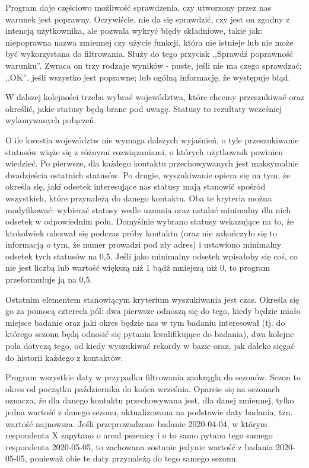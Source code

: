 \documentclass[12pt, twoside, hidelinks]{report}
\begin{document}
Program daje częściowo możliwość sprawdzenia, czy utworzony przez nas warunek jest poprawny. Oczywiście, nie da się sprawdzić, czy jest on zgodny z intencją użytkownika, ale pozwala wykryć błędy składniowe, takie jak: niepoprawna nazwa zmiennej czy użycie funkcji, która nie istnieje lub nie może być wykorzystana do filtrowania. Służy do tego przycisk ,,Sprawdź poprawność warunku''. Zwraca on trzy rodzaje wyników - puste, jeśli nie ma czego sprawdzać; ,,OK'', jeśli wszystko jest poprawne; lub ogólną informację, że występuje błąd. \par
W dalszej kolejności trzeba wybrać województwa, które chcemy przeszukiwać oraz określić, jakie statusy będą brane pod uwagę. Statusy to rezultaty wcześniej wykonywanych połączeń. \par
O ile kwestia województw nie wymaga dalszych wyjaśnień, o tyle przeszukiwanie statusów wiąże się z różnymi rozwiązaniami, o których użytkownik powinien wiedzieć. Po pierwsze, dla każdego kontaktu przechowywanych jest maksymalnie dwadzieścia ostatnich statusów. Po drugie, wyszukiwanie opiera się na tym, że określa się, jaki odsetek interesujące nas statusy mają stanowić spośród wszystkich, które przynależą do danego kontaktu. Oba te kryteria można modyfikować: wybierać statusy wedle uznania oraz ustalać minimalny dla nich odsetek w odpowiednim polu. Domyślnie wybrano statusy wskazujące na to, że ktokolwiek odezwał się podczas próby kontaktu (oraz nie zakończyło się to informacją o tym, że numer prowadzi pod zły adres) i ustawiono minimalny odsetek tych statusów na 0,5. Jeśli jako minimalny odsetek wpisałoby się coś, co nie jest liczbą lub wartość większą niż 1 bądź mniejszą niż 0, to program przeformułuje ją na 0,5.\par
Ostatnim elementem stanowiącym kryterium wyszukiwania jest czas. Określa się go za pomocą czterech pól: dwa pierwsze odnoszą się do tego, kiedy będzie miało miejsce badanie oraz jaki okres będzie nas w tym badaniu interesował (tj. do którego sezonu będą odnosić się pytania kwalifikujące do badania), dwa kolejne pola dotyczą tego, od kiedy wyszukiwać rekordy w bazie oraz, jak daleko sięgać do historii każdego z kontaktów. \par
Program wszystkie daty w przypadku filtrowania zaokrągla do sezonów. Sezon to okres od początku października do końca września. Oparcie się na sezonach oznacza, że dla danego kontaktu przechowywana jest, dla danej zmiennej, tylko jedna wartość z danego sezonu, aktualizowana na podstawie daty badania, tzn. wartość najnowsza. Jeśli przeprowadzono badanie 2020-04-04, w którym respondenta X zapytano o areał pszenicy i o to samo pytano tego samego respondenta 2020-05-05, to zachowana zostanie jedynie wartość z badania 2020-05-05, ponieważ obie te daty przynależą do tego samego sezonu.  \par
\end{document}
